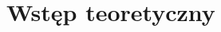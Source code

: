 \documentclass[PZM.tex]{subfiles}
\begin{document}
\section{Wstęp teoretyczny}
	\label{Wstep}
	
\end{document}
